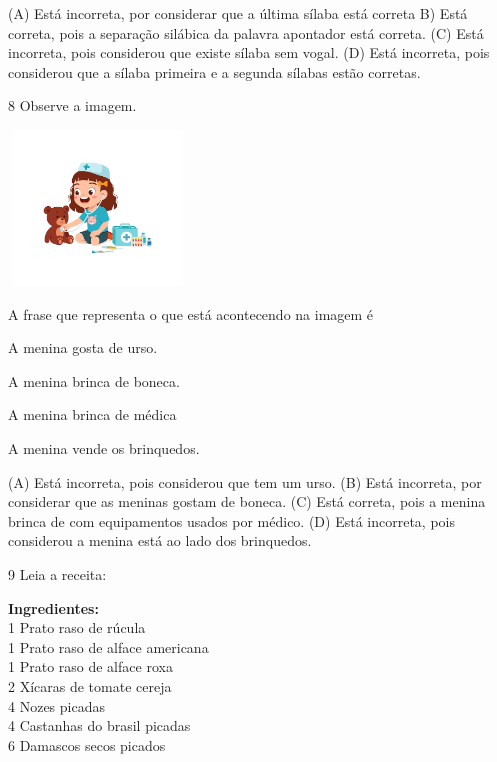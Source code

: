 (A) Está incorreta, por considerar que a última sílaba está correta
B) Está correta, pois a separação silábica da palavra apontador está correta.
(C) Está incorreta, pois considerou que existe sílaba sem vogal.
(D) Está incorreta, pois considerou que a sílaba primeira e a segunda sílabas estão corretas.

\num{8} Observe a imagem.

\includegraphics[width=1.87273in,height=1.62645in]{media/image169.jpeg}


A frase que representa o que está acontecendo na imagem é

\begin{escolha}
\item A menina gosta de urso.

\item A menina brinca de boneca.

\item A menina brinca de médica

\item A menina vende os brinquedos.
\end{escolha}


(A) Está incorreta, pois considerou que tem um urso.
(B) Está incorreta, por considerar que as meninas gostam de boneca.
(C) Está correta, pois a menina brinca de com equipamentos usados por médico.
(D) Está incorreta, pois considerou a menina está ao lado dos brinquedos.

\num{9} Leia a receita:

\textbf{Ingredientes:}\\
1 Prato raso de rúcula\\
1 Prato raso de alface americana\\
1 Prato raso de alface roxa\\
2 Xícaras de tomate cereja\\
4 Nozes picadas\\
4 Castanhas do brasil picadas\\
6 Damascos secos picados

